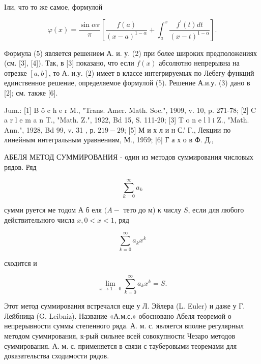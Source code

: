 \documentclass[10pt]{article}
\begin{document}
Іли, что то же самое, формулой



\[

\varphi(x)=\frac{\sin \alpha \pi}{\pi}\left[\frac{f(a)}{(x-a)^{1-\alpha}}+\int_{a}^{x} \frac{f^{\prime}(t) d t}{(x-t)^{1-\alpha}}\right] .

\]



Формула (5) является решением А. и. у. (2) при более широких предположениях (см. [3], [4]). Так, в [3] показано, что если $f(x)$ абсолютно непрерывна на отрезке $[a, b]$, то А. и.у. (2) имеет в классе интегрируемых по Лебегу функций единственное решение, определяемое формулой (5). Решение А.и.у. (3) дано в [2]; см. также [6].



Jum.: [1] B ô c h e r M., "Trans. Amer. Math. Soc.", 1909, v. 10, p. 271-78; [2] C a r l e m a n T., "Math. Z.", 1922, Bd 15, S. 111-20; [3] T o n e l l i Z., "Math. Ann.", 1928, Bd 99, v. 31 , р. $219-29$; [5] М и х л и н С.' Г., Лекции по линейным интегральным уравнениям, М., 1959; [6] Г а х о в Ф. Д.,



АБЕЛЯ МЕТОД СУММИРОВАНИЯ - один из методов суммирования числовых рядов. Ряд



\[

\sum_{k=0}^{\infty} a_{k}

\]



сумми руется ме тодом А б еля $(A-$ тето до м) к числу $S$, если для любого действительного числа $x, 0<x<1$, ряд



\[

\sum_{k=0}^{\infty} a_{k} x^{k}

\]



сходится и



\[

\lim _{x \rightarrow 1-0} \sum_{k=0}^{\infty} a_{k} x^{k}=S .

\]



Этот метод суммирования встречался еще у Л. Эйлера (L. Euler) и даже у Г. Лейбница (G. Leibniz). Название «А.м.с.» обосновано Абеля теоремой о непрерывности суммы степенного ряда. А. м. с. является вполне регулярныл методом суммирования, к-рый сильнее всей совокупности Чезаро методов суммирования. А. м. с. применяется в связи с тауберовыми теоремами для доказательства сходимости рядов.
\end{document}
